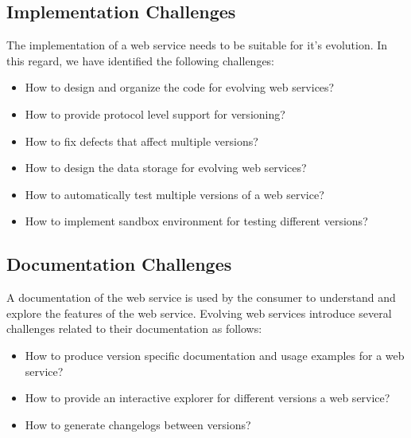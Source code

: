 \documentclass[runningheads,a4paper]{llncs}
\begin{document}

\subsection{Implementation Challenges} %
\label{sub:implementation_challenges}

The implementation of a web service needs to be suitable for it’s evolution. In this regard, we have identified the following challenges:
\begin{itemize}
  \item How to design and organize the code for evolving web services?
  \item How to provide protocol level support for versioning?
  \item How to fix defects that affect multiple versions?
  \item How to design the data storage for evolving web services?
  \item How to automatically test multiple versions of a web service?
  \item How to implement sandbox environment for testing different versions?
\end{itemize}


\subsection{Documentation Challenges} %
\label{ssub:documentation_challenges}
A documentation of the web service is used by the consumer to understand and explore the features of the web service. Evolving web services introduce several challenges related to their documentation as follows:
\begin{itemize}
  \item How to produce version specific documentation and usage examples for a web service?
  \item How to provide an interactive explorer for different versions a web service?
  \item How to generate changelogs between versions?
\end{itemize}
\end{document}
